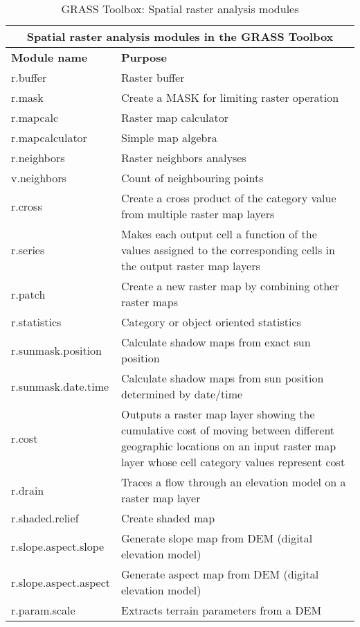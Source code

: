 \begin{table}[ht]
\centering
\caption{GRASS Toolbox: Spatial raster analysis modules}\medskip
 \begin{tabular}{|p{4cm}|p{12cm}|}
  \hline \multicolumn{2}{|c|}{\textbf{Spatial raster analysis modules in the
  GRASS Toolbox}} \\
  \hline \textbf{Module name} & \textbf{Purpose} \\
  \hline r.buffer & Raster buffer \\
  \hline r.mask & Create a MASK for limiting raster operation \\
  \hline r.mapcalc & Raster map calculator \\
  \hline r.mapcalculator & Simple map algebra \\
  \hline r.neighbors & Raster neighbors analyses \\
  \hline v.neighbors & Count of neighbouring points \\
  \hline r.cross & Create a cross product of the category value from multiple
  raster map layers \\
  \hline r.series & Makes each output cell a function of the values assigned
  to the corresponding cells in the output raster map layers\\
  \hline r.patch & Create a new raster map by combining other raster maps \\
  \hline r.statistics & Category or object oriented statistics \\
  \hline r.sunmask.position & Calculate shadow maps from exact sun position \\
  \hline r.sunmask.date.time & Calculate shadow maps from sun position determined by date/time\\
  \hline r.cost & Outputs a raster map layer showing the cumulative cost of
  moving between different geographic locations on an input raster map layer
  whose cell category values represent cost\\
  \hline r.drain & Traces a flow through an elevation model on a raster map
  layer \\
  \hline r.shaded.relief & Create shaded map \\
  \hline r.slope.aspect.slope & Generate slope map from DEM (digital
  elevation model) \\
  \hline r.slope.aspect.aspect & Generate aspect map from DEM (digital
  elevation model) \\
  \hline r.param.scale & Extracts terrain parameters from a DEM \\

\end{tabular}
\end{table}
